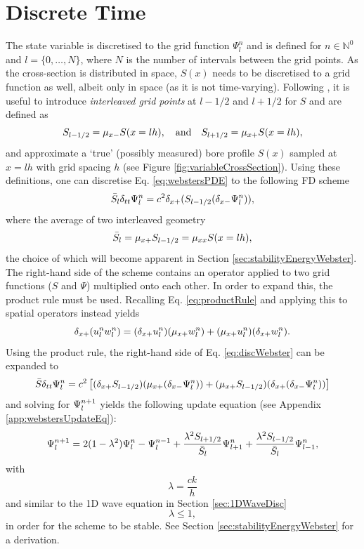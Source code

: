 \section{Discrete Time}
The state variable is discretised to the grid function $\Psi_l^n$ and is defined for $n\in \mathbb{N}^0$ and $l = \{0, \hdots, N\}$, where $N$ is the number of intervals between the grid points.
As the cross-section is distributed in space, $S(x)$ needs to be discretised to a grid function as well, albeit only in space (as it is not time-varying). Following \cite{Bilbao2018}, it is useful to introduce \textit{interleaved grid points} at $l-1/2$ and $l+1/2$ for $S$ and are defined as 
\begin{equation}\label{eq:sHalf}
    S_{l-1/2} = \mu_{x-} S(x=lh), \quad \text{and} \quad S_{l+1/2} = \mu_{x+} S(x=lh),
\end{equation}
and approximate a `true' (possibly measured) bore profile $S(x)$ sampled at $x=lh$ with grid spacing $h$ (see Figure \ref{fig:variableCrossSection}). Using these definitions, one can discretise Eq. \eqref{eq:webstersPDE} to the following FD scheme \cite{Bilbao2018}
\begin{equation}\label{eq:discWebster}
    \bar{S}_l \delta_{tt}\Psi^n_l = c^2\delta_{x+}(S_{l-1/2}(\delta_{x-}\Psi_l^n)),
\end{equation}
where the average of two interleaved geometry
\begin{equation}\label{eq:Sbar}
    \bar{S}_l = \mu_{x+}S_{l-1/2} = \mu_{xx} S(x=lh),
\end{equation}
the choice of which will become apparent in Section \ref{sec:stabilityEnergyWebster}.
The right-hand side of the scheme contains an operator applied to two grid functions ($S$ and $\Psi$) multiplied onto each other. In order to expand this, the product rule must be used. Recalling Eq. \eqref{eq:productRule} and applying this to spatial operators instead yields
\begin{equation}
    \delta_{x+} (u_l^nw_l^n) = (\delta_{x+} u_l^n)(\mu_{x+} w_l^n) + (\mu_{x+} u_l^n)(\delta_{x+} w_l^n).
\end{equation}
Using the product rule, the right-hand side of Eq. \eqref{eq:discWebster} can be expanded to
\begin{equation*}
    \bar{S}\delta_{tt}\Psi_l^n = c^2\left[(\delta_{x+} S_{l-1/2})(\mu_{x+} (\delta_{x-} \Psi_l^n)) + (\mu_{x+} S_{l-1/2})(\delta_{x+} (\delta_{x-} \Psi_l^n))\right]
\end{equation*}
and solving for $\Psi_l^{n+1}$ yields the following update equation (see Appendix \ref{app:webstersUpdateEq}):
\begin{equation}
    \Psi_l^{n+1} = 2(1-\lambda^2)\Psi_l^n-\Psi_l^{n-1}+ \frac{\lambda^2S_{l+1/2}}{\bar{S}_l}\Psi_{l+1}^n + \frac{\lambda^2S_{l-1/2}}{\bar{S}_l}\Psi_{l-1}^n,\label{eq:webstersUpdateEq}
\end{equation}
with 
\begin{equation}
    \lambda = \frac{ck}{h}
\end{equation}
and similar to the 1D wave equation in Section \ref{sec:1DWaveDisc}
\begin{equation}\label{eq:CFLwebster}
    \lambda \leq 1,
\end{equation}
in order for the scheme to be stable. See Section \ref{sec:stabilityEnergyWebster} for a derivation.

